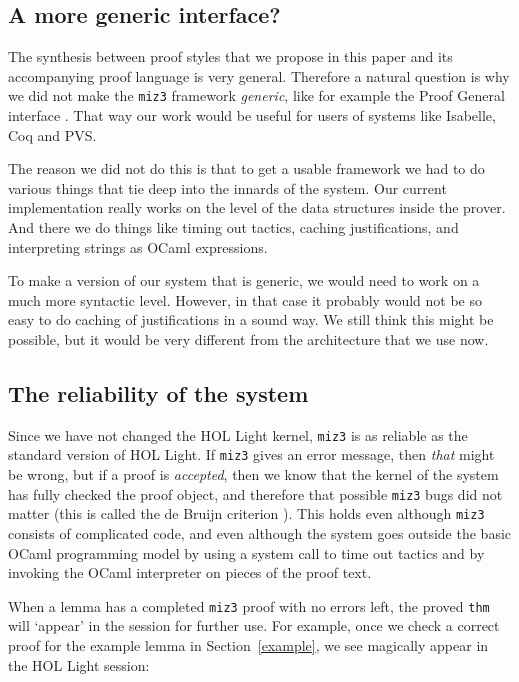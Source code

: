 \documentclass{LMCS}
\begin{document}
\subsection{A more generic interface?}

\noindent
The synthesis between proof styles that
we propose in this paper and its accompanying proof language
is very general.
Therefore a natural question is why we did not make the \texttt{miz3}
framework \emph{generic}, like for example the Proof General interface \cite{asp:00}.
That way our work would be useful for users of systems like
Isabelle, Coq and PVS.

The reason we did not do this is that to get a usable
framework we had to do various things that tie deep into the innards
of the system.
Our current implementation really works on the level of the
data structures inside the prover.
And there we do things like timing out tactics, caching justifications,
and interpreting strings as OCaml expressions.

To make a version of our system that is generic, we would need
to work on a much more syntactic level.
However, in that case it probably would not be so easy to do caching of
justifications in a sound way.
We still think this might be possible, but it would be very different from the
architecture that we use now.

\subsection{The reliability of the system}

\noindent
Since we have not changed the HOL Light kernel,
\texttt{miz3} is as reliable as the standard version of HOL Light.
If \texttt{miz3} gives an error message, then \emph{that} might be wrong,
but if a proof is \emph{accepted}, then we know that the
kernel of the system has fully checked the proof object,
and therefore that possible \texttt{miz3} bugs did not matter
(this is called the {de Bruijn criterion} \cite{bar:wie:06}).
This holds even although \texttt{miz3} consists of complicated code,
and even although the system goes outside the basic OCaml
programming model by using a system call to time out tactics and
by invoking the OCaml interpreter on pieces of the proof text.

When a lemma has a completed \texttt{miz3} proof with no errors left,
the proved \texttt{thm} will `appear' in the session for further use.
For example, once we check a correct proof for the example lemma
in Section~\ref{example},
we see magically appear in the HOL Light session:
\end{document}
